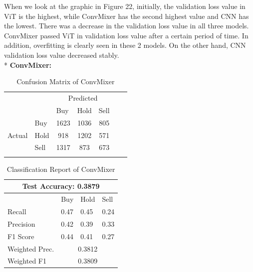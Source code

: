 \documentclass[]{article}
\begin{document}
\noindent
When we look at the graphic in Figure 22, initially, the validation loss value in ViT is the highest, while ConvMixer has the second highest value and CNN has the lowest. There was a decrease in the validation loss value in all three models. ConvMixer passed ViT in validation loss value after a certain period of time. In addition, overfitting is clearly seen in these 2 models. On the other hand, CNN validation loss value decreased stably. \vspace{0.2cm}\\*
\textbf{ConvMixer:}
\begin{table}[H]
    \centering
    \caption{Confusion Matrix of ConvMixer}
    \begin{tabular}{llcccll}
        \cline{1-5}
        \multicolumn{1}{|l|}{} & \multicolumn{1}{l|}{} & \multicolumn{3}{c|}{Predicted} & & \\\cline{1-5} \multicolumn{1}{|l|}{} & \multicolumn{1}{l|}{} & \multicolumn{1}{l|}{Buy} & \multicolumn{1}{l|}{Hold} & \multicolumn{1}{l|}{Sell} & & \\ \cline{1-5} \multicolumn{1}{|c|}{\multirow{3}{*}{Actual}} & \multicolumn{1}{l|}{Buy} & \multicolumn{1}{c|}{1623} & \multicolumn{1}{c|}{1036} & \multicolumn{1}{c|}{805} & & \\ \cline{2-5} \multicolumn{1}{|c|}{} & \multicolumn{1}{l|}{Hold} & \multicolumn{1}{c|}{918} & \multicolumn{1}{c|}{1202}  & \multicolumn{1}{c|}{571}& & \\ \cline{2-5} \multicolumn{1}{|c|}{} & \multicolumn{1}{l|}{Sell} & \multicolumn{1}{c|}{1317} & \multicolumn{1}{c|}{873} & \multicolumn{1}{c|}{673} & & \\ \cline{1-5} & & \multicolumn{1}{l}{} & \multicolumn{1}{l}{} & \multicolumn{1}{l}{} &&
    \end{tabular}
\end{table}
\begin{table}[H]
\centering
\caption{Classification Report of ConvMixer}
\begin{tabular}{|llll|}
\hline
\multicolumn{4}{|c|}{Test Accuracy: 0.3879}                                                         \\ \hline
\multicolumn{1}{|l|}{}               & \multicolumn{1}{l|}{Buy}  & \multicolumn{1}{l|}{Hold} & Sell \\ \hline
\multicolumn{1}{|l|}{Recall}         & \multicolumn{1}{l|}{0.47} & \multicolumn{1}{l|}{0.45} & 0.24 \\ \hline
\multicolumn{1}{|l|}{Precision}      & \multicolumn{1}{l|}{0.42} & \multicolumn{1}{l|}{0.39} & 0.33 \\ \hline
\multicolumn{1}{|l|}{F1 Score}       & \multicolumn{1}{l|}{0.44} & \multicolumn{1}{l|}{0.41} & 0.27 \\ \hline
\multicolumn{1}{|l|}{Weighted Prec.} & \multicolumn{3}{c|}{0.3812}                                  \\ \hline
\multicolumn{1}{|l|}{Weighted F1}    & \multicolumn{3}{c|}{0.3809}                                  \\ \hline
\end{tabular}
\end{table}
\end{document}
